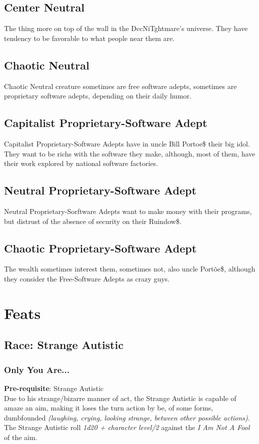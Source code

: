 \documentclass[ letterpaper,12pt]{article}
\begin{document}
\subsection{Center Neutral} The thing more on top of the wall in the DccNiTghtmare's universe.  They have tendency to be favorable to what people near them are.
\subsection{Chaotic Neutral} Chaotic Neutral creature sometimes are free software adepts, sometimes are proprietary software adepts, depending on their daily humor.
\subsection{Capitalist Proprietary-Software Adept} Capitalist Proprietary-Software Adepts have in uncle Bill Portoe\$ their big idol. They want to be richs with the software they make, although, most of them, have their work explored by national software factories.
\subsection{Neutral Proprietary-Software Adept} Neutral Proprietary-Sorftware Adepts want to make money with their programs, but distrust of the absence of security on their Ruindow\$.
\subsection{Chaotic Proprietary-Software Adept} The wealth sometimes interest them, sometimes not, also uncle Portõe\$, although they consider the Free-Software Adepts as crazy guys.


\section{Feats}

\subsection{Race: Strange Autistic}

\subsubsection{Only You Are...}
 {\bf Pre-requisite}: Strange Autistic\\
Due to his strange/bizarre manner of act, the Strange Autistic is capable of amaze an aim, making it loses the turn action by be, of some forms, dumbfounded {\it (laughing, crying, looking strange, between other possible actions)}.  The Strange Autistic roll {\it 1d20 + character level/2} against the {\it I Am Not A Fool} of the aim.
\end{document}
